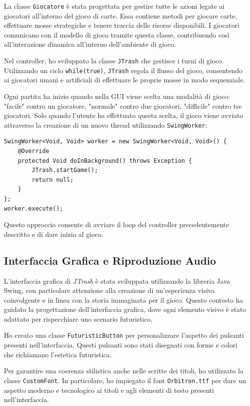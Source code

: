 La classe \texttt{Giocatore} è stata progettata per gestire tutte le azioni legate ai giocatori all'interno del gioco di carte. Essa contiene metodi per giocare carte, effettuare mosse strategiche e tenere traccia delle risorse disponibili. I giocatori comunicano con il modello di gioco tramite questa classe, contribuendo così all'interazione dinamica all'interno dell'ambiente di gioco.

Nel controller, ho sviluppato la classe \texttt{JTrash} che gestisce i turni di gioco. Utilizzando un ciclo \texttt{while(true)}, \texttt{JTrash} regola il flusso del gioco, consentendo ai giocatori umani e artificiali di effettuare le proprie mosse in modo sequenziale. 

Ogni partita ha inizio quando nella GUI viene scelta una modalità di gioco: "facile" contro un giocatore, "normale" contro due giocatori, "difficile" contro tre giocatori. Solo quando l'utente ha effettuato questa scelta, il gioco viene avviato attraverso la creazione di un nuovo thread utilizzando \texttt{SwingWorker}:

\begin{verbatim}
SwingWorker<Void, Void> worker = new SwingWorker<Void, Void>() {
    @Override
    protected Void doInBackground() throws Exception {
        JTrash.startGame();
        return null;
    }
};
worker.execute();
\end{verbatim}

Questo approccio consente di avviare il loop del controller precedentemente descritto e di dare inizio al gioco.

\subsection{Interfaccia Grafica e Riproduzione Audio}
L'interfaccia grafica di \textit{JTrash} è stata sviluppata utilizzando la libreria Java Swing, con particolare attenzione alla creazione di un'esperienza visiva coinvolgente e in linea con la storia immaginata per il gioco. Questo contesto ha guidato la progettazione dell'interfaccia grafica, dove ogni elemento visivo è stato adattato per rispecchiare uno scenario futuristico.

Ho creato una classe \texttt{FuturisticButton} per personalizzare l'aspetto dei pulsanti presenti nell'interfaccia. Questi pulsanti sono stati disegnati con forme e colori che richiamano l'estetica futuristica.

Per garantire una coerenza stilistica anche nelle scritte dei titoli, ho utilizzato la classe \texttt{CustomFont}. In particolare, ho impiegato il font \texttt{Orbitron.ttf} per dare un aspetto moderno e tecnologico ai titoli e agli elementi di testo presenti nell'interfaccia.

